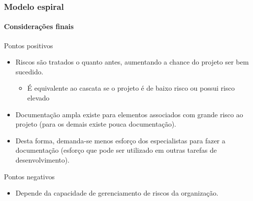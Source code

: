 \begin{frame}[hasnext=false, hasprev=true]
	\frametitle{Modelo espiral}
	\framesubtitle{Considerações finais}

	\begin{block:fact}{Pontos positivos}
		\begin{itemize}
			\item Riscos são tratados o quanto antes, aumentando a chance do projeto
			ser bem sucedido.
			\begin{itemize}
				\item É equivalente ao cascata se o projeto é de baixo risco ou possui
				risco elevado
			\end{itemize}
			
			\item Documentação ampla existe para elementos associados com grande risco
			ao projeto (para os demais existe pouca documentação).
			
			\item Desta forma, demanda-se menos esforço dos especialistas para fazer
			a documentação (esforço que pode ser utilizado em outras tarefas de
			desenvolvimento).
		\end{itemize}
	\end{block:fact}

	\begin{block:fact}{Pontos negativos}
		\begin{itemize}
			\item Depende da capacidade de gerenciamento de riscos da organização.
		\end{itemize}
	\end{block:fact}
\end{frame}
